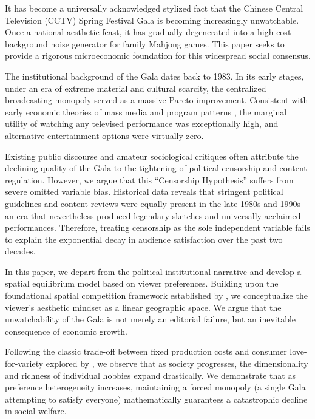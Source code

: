 \documentclass[AER]{AEA}
\begin{document}

It has become a universally acknowledged stylized fact that the Chinese Central Television (CCTV) Spring Festival Gala is becoming increasingly unwatchable. Once a national aesthetic feast, it has gradually degenerated into a high-cost background noise generator for family Mahjong games. This paper seeks to provide a rigorous microeconomic foundation for this widespread social consensus.

The institutional background of the Gala dates back to 1983. In its early stages, under an era of extreme material and cultural scarcity, the centralized broadcasting monopoly served as a massive Pareto improvement. Consistent with early economic theories of mass media and program patterns \citep{steiner1952}, the marginal utility of watching any televised performance was exceptionally high, and alternative entertainment options were virtually zero.

Existing public discourse and amateur sociological critiques often attribute the declining quality of the Gala to the tightening of political censorship and content regulation. However, we argue that this ``Censorship Hypothesis'' suffers from severe omitted variable bias. Historical data reveals that stringent political guidelines and content reviews were equally present in the late 1980s and 1990s—an era that nevertheless produced legendary sketches and universally acclaimed performances. Therefore, treating censorship as the sole independent variable fails to explain the exponential decay in audience satisfaction over the past two decades.

In this paper, we depart from the political-institutional narrative and develop a spatial equilibrium model based on viewer preferences. Building upon the foundational spatial competition framework established by \citet{hotelling1929}, we conceptualize the viewer's aesthetic mindset as a linear geographic space. We argue that the unwatchability of the Gala is not merely an editorial failure, but an inevitable consequence of economic growth.

Following the classic trade-off between fixed production costs and consumer love-for-variety explored by \citet{dixit1977}, we observe that as society progresses, the dimensionality and richness of individual hobbies expand drastically. We demonstrate that as preference heterogeneity increases, maintaining a forced monopoly (a single Gala attempting to satisfy everyone) mathematically guarantees a catastrophic decline in social welfare.
\end{document}
